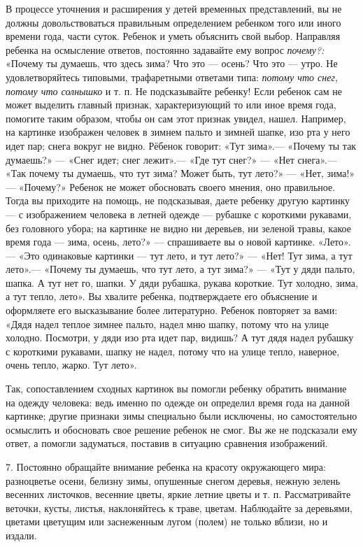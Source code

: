 \documentclass{book}
\renewcommand{\emph}[1]{\textit{#1}}
\begin{document}
В процессе уточнения и расширения у детей временных представлений, вы не
должны довольствоваться правильным определением ребенком того или иного
времени года, части суток. Ребенок и уметь объяснить свой выбор.
Направляя ребенка на осмысление ответов, постоянно задавайте ему вопрос
\emph{почему?:} «Почему ты думаешь, что здесь зима? Что это --- осень?
Что это --- утро. Не удовлетворяйтесь типовыми, трафаретными ответами
типа: \emph{потому что снег, потому что солнышко} и т. п. Не
подсказывайте ребенку! Если ребенок сам не может выделить главный
признак, характеризующий то или иное время года, помогите таким образом,
чтобы он сам этот признак увидел, нашел. Например, на картинке изображен
человек в зимнем пальто и зимней шапке, изо рта у него идет пар; снега
вокруг не видно. Рёбенок говорит: «Тут зима».--- «Почему ты так
думаешь?» --- «Снег идет; снег лежит».--- «Где тут снег?» --- «Нет
снега».--- «Так почему ты думаешь, что тут зима? Может быть, тут лето?»
--- «Нет, зима!» --- «Почему?» Ребенок не может обосновать своего
мнения, оно правильное. Тогда вы приходите на помощь, не подсказывая,
даете ребенку другую картинку --- с изображением человека в летней
одежде --- рубашке с короткими рукавами, без головного убора; на
картинке не видно ни деревьев, ни зеленой травы, какое время года ---
зима, осень, лето?» --- спрашиваете вы о новой картинке. «Лето».--- «Это
одинаковые картинки --- тут лето, и тут лето?» --- «Нет! Тут зима, а тут
лето».--- «Почему ты думаешь, что тут лето, а тут зима?» --- «Тут у дяди
пальто, шапка. А тут нет го, шапки. У дяди рубашка, рукава короткие. Тут
холодно, зима, а тут тепло, лето». Вы хвалите ребенка, подтверждаете его
объяснение и оформляете его высказывание более литературно. Ребенок
повторяет за вами: «Дядя надел теплое зимнее пальто, надел мню шапку,
потому что на улице холодно. Посмотри, у дяди изо рта идет пар, видишь?
А тут дядя надел рубашку с короткими рукавами, шапку не надел, потому
что на улице тепло, наверное, очень тепло, жарко. Тут лето».

Так, сопоставлением сходных картинок вы помогли ребенку обратить
внимание на одежду человека: ведь именно по одежде он определил время
года на данной картинке; другие признаки зимы специально были исключены,
но самостоятельно осмыслить и обосновать свое решение ребенок не смог.
Вы же не подсказали ему ответ, а помогли задуматься, поставив в ситуацию
сравнения изображений.

7. Постоянно обращайте внимание ребенка на красоту окружающего мира:
разноцветье осени, белизну зимы, опушенные снегом деревья, нежную зелень
весенних листочков, весенние цветы, яркие летние цветы и т. п.
Рассматривайте веточки, кусты, листья, наклоняйтесь к траве, цветам.
Наблюдайте за деревьями, цветами цветущим или заснеженным лугом (полем)
не только вблизи, но и издали.
\end{document}
